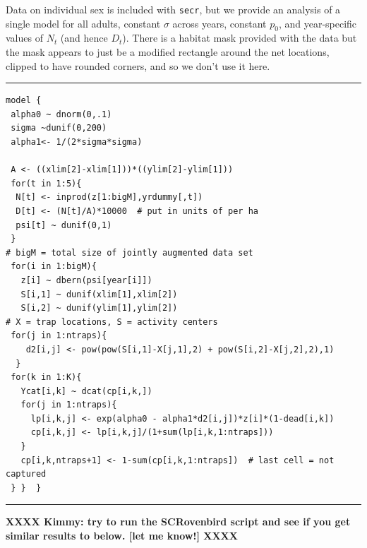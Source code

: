 Data on individual sex is included
with \mbox{\tt secr}, but  we provide an analysis of a single model
for all adults, constant $\sigma$ across years, constant $p_{0}$, and
year-specific values of $N_{t}$ (and hence $D_{t}$). 
 There is a habitat mask provided with the data but the mask
appears to just be a modified rectangle around the net locations,
clipped to have rounded corners, and so we don't use it here. 






\begin{panel}[htp]
\centering
\rule[0.15in]{\textwidth}{.03in}
{\small
\begin{verbatim}
model {
 alpha0 ~ dnorm(0,.1)
 sigma ~dunif(0,200)
 alpha1<- 1/(2*sigma*sigma)

 A <- ((xlim[2]-xlim[1]))*((ylim[2]-ylim[1]))
 for(t in 1:5){
  N[t] <- inprod(z[1:bigM],yrdummy[,t])
  D[t] <- (N[t]/A)*10000  # put in units of per ha
  psi[t] ~ dunif(0,1)
 }
# bigM = total size of jointly augmented data set
 for(i in 1:bigM){
   z[i] ~ dbern(psi[year[i]])
   S[i,1] ~ dunif(xlim[1],xlim[2])
   S[i,2] ~ dunif(ylim[1],ylim[2])
# X = trap locations, S = activity centers
 for(j in 1:ntraps){
    d2[i,j] <- pow(pow(S[i,1]-X[j,1],2) + pow(S[i,2]-X[j,2],2),1)
  }
 for(k in 1:K){
   Ycat[i,k] ~ dcat(cp[i,k,])
   for(j in 1:ntraps){
     lp[i,k,j] <- exp(alpha0 - alpha1*d2[i,j])*z[i]*(1-dead[i,k])        
     cp[i,k,j] <- lp[i,k,j]/(1+sum(lp[i,k,1:ntraps]))
   }
   cp[i,k,ntraps+1] <- 1-sum(cp[i,k,1:ntraps])  # last cell = not captured
 } }  }
\end{verbatim}
}
\rule[-0.15in]{\textwidth}{.03in}
\caption{
{\bf BUGS} model specification for the non-parametric multi-session
model in which each $N_{t}$ is independent of the other. The implied
prior (by data augmentation) is that $N_{t} \sim
\mbox{Uniform}(0,100)$. 
To fit this model to the ovenbird data, see
 \mbox{\tt ?SCRovenbird} in the {\bf R} package \mbox{\tt scrbook}.
}
\label{poisson-mn.panel.ovenbird}
\end{panel}

{\bf XXXX Kimmy: try to run the SCRovenbird script and see if you get
  similar results to below. [let me know!] XXXX}


